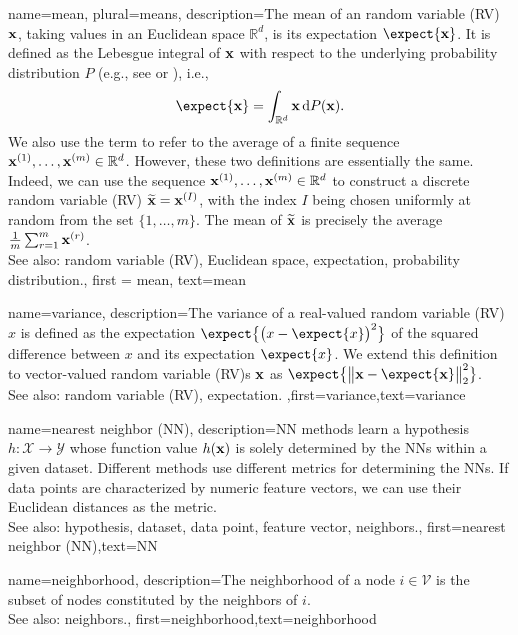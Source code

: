 {
	name={mean}, plural={means},
	description={The  mean of an random variable (RV) ${\bf x}$, taking 
 values in an Euclidean space $\mathbb{R}^{d}$, is its 
 expectation $\expect\{{\bf x}\}$. It is defined as the Lebesgue 
 integral of ${\bf x}$ with respect to the underlying probability distribution $P$ (e.g., see \cite{BillingsleyProbMeasure} or \cite{RudinBookPrinciplesMatheAnalysis}), i.e.,
\[
\expect\{{\bf x}\} = \int_{\mathbb{R}^{d}} {\bf x} \, \mathrm{d}P({\bf x}).
\] 
We also use the term to refer to the average of a finite sequence 
${\bf x}^{(1)}, \ldots, {\bf x}^{(m)} \in \mathbb{R}^{d}$. However, 
these two definitions are essentially the same. Indeed, we can use the sequence 
${\bf x}^{(1)}, \ldots, {\bf x}^{(m)} \in \mathbb{R}^{d}$ to construct a 
discrete random variable (RV) $\widetilde{{\bf x}}={\bf x}^{(I)}$, with the index $I$ being chosen uniformly 
at random from the set $\{1,\ldots,m\}$. The mean of $\widetilde{{\bf x}}$ is 
precisely the average $\frac{1}{m} \sum_{r=1}^{m} {\bf x}^{(r)}$.
			\\ 
		See also: random variable (RV), Euclidean space, expectation, probability distribution.}, 
		first = {mean}, text={mean} 
}

{
	name={variance},
	description={The variance of a real-valued random variable (RV) $x$ is defined as the expectation 
		$\expect\big\{ \big( x - \expect\{x \} \big)^{2} \big\}$ of the squared difference between $x$ 
		and its expectation $\expect\{x \}$. We extend this definition to vector-valued random variable (RV)s ${\bf x}$ 
		as $\expect\big\{ \big\| {\bf x} - \expect\{{\bf x} \} \big\|_{2}^{2} \big\}$.
					\\ 
		See also: random variable (RV), expectation.} ,first={variance},text={variance} 
}

{
	name={nearest neighbor (NN)},
	description={NN methods learn a hypothesis 
		$h: \mathcal{X} \rightarrow \mathcal{Y}$ whose function value $h({\bf x})$ 
		is solely determined by the NNs within a given dataset. Different 
		methods use different metrics for determining the NNs. If data points 
		are characterized by numeric feature vectors, we can use their Euclidean distances as 
		the metric.
					\\ 
		See also: hypothesis, dataset, data point, feature vector, neighbors.},
	first={nearest neighbor (NN)},text={NN} 
}

{
	name={neighborhood},
	description={The neighborhood of a node $i \in \mathcal{V}$ is 
	the subset of nodes constituted by the neighbors of $i$.
				\\ 
		See also: neighbors.},
	first={neighborhood},text={neighborhood} 
}


